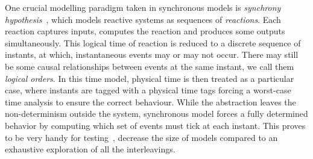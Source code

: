 \documentclass{fcs}
\begin{document}
One crucial modelling paradigm taken in synchronous models is \emph{synchrony hypothesis}~\cite{Benveniste03},
which models reactive systems as sequences of \emph{reactions}.
Each reaction captures inputs, computes the reaction and produces some outputs simultaneously. 
This logical time of reaction is reduced to a discrete sequence of instants, at which, instantaneous events may or may not occur. 
There may still be some causal relationships between events at the same instant, we call them \emph{logical orders}. 
In this time model, physical time is then treated as a particular case, where instants are tagged with a physical time tags forcing a worst-case time analysis to ensure the correct behaviour. 
While the abstraction leaves the non-determinism outside the system, synchronous model forces a fully determined behavior by computing which set of events must tick at each instant. 
This proves to be very handy for testing~\cite{Lee15,Lohstroh19}, decrease the size of models compared to an exhaustive exploration of all the interleavings. 
\end{document}

